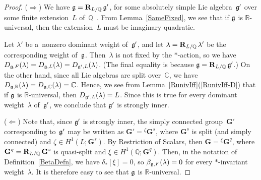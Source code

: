 \begin{proof}
($\Rightarrow$) We have $\Lie G = \Res{L/\mathbb{Q}} \Lie G'$, for some absolutely simple Lie algebra~$\Lie G'$ over
some f\/inite extension~$L$ of~$\mathbb{Q}$~\cite[\S~3.1.2]{Tits-Classification}.
From Lemma~\ref{SameFixed}, we see that if $\Lie G$ is $\mathbb{R}$-universal, then the extension~$L$ must be imaginary
quadratic.

Let $\lambda'$ be a~nonzero dominant weight of~$\Lie G'$, and let $\lambda = \mathop{\mathbf{R}_{L/\mathbb{Q}}} \lambda'$ be the
corresponding weight of~$\Lie G$.
Then~$\lambda$ is not f\/ixed by the $*$-action, so we have $D_{\Lie g, F}(\lambda) = D_{\Lie g, L}(\lambda) = D_{\Lie g',
L}(\lambda)$.
(The f\/inal equality is because $\Lie G = \Res{L/\mathbb{Q}} \Lie G'$.) On the other hand, since all Lie algebras are
split over~$\mathbb{C}$, we have $D_{\Lie g, \mathbb{R}}(\lambda) = D_{\Lie g, \mathbb{C}}(\lambda) = \mathbb{C}$.
Hence, we see from Lemma~\ref{RunivIff}(\ref{RunivIff-D}) that if $\Lie G$ is $\mathbb{R}$-universal, then $D_{\Lie g', L}(\lambda)
= L$.
Since this is true for every dominant weight~$\lambda$ of~$\Lie G'$, we conclude that $\Lie G'$ is strongly inner.

($\Leftarrow$) Note that, since $\Lie G'$ is strongly inner, the simply connected group~$\mathbf{G}'$ corresponding
to~$\Lie G'$ may be written as $\mathbf{G}' = {}^{\zeta} \mathbf{G}^s$, where $\mathbf{G}^s$ is split (and simply
connected) and $\zeta \in H^1(L; \mathbf{G}^s)$.
By Restriction of Scalars, then $\mathbf{G} = {}^{\xi} \mathbf{G}^q$, where $\mathbf{G}^q = \mathop{\mathbf{R}_{L/\mathbb{Q}}}
\mathbf{G}^s$ is quasi-split and $\xi \in H^1(\mathbb{Q}; \mathbf{G}^q)$.
Then, in the notation of Def\/inition~\ref{BetaDefn}, we have $\delta_*[\xi] = 0$, so $\beta_{\Lie G, F}(\lambda) = 0$ for every
$*$-invariant weight~$\lambda$.
It is therefore easy to see that $\Lie G$ is $\mathbb{R}$-universal.
\end{proof}

